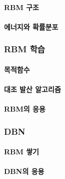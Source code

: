\documentclass [12pt] {oblivoir}
\let\oldsubsubsection=\subsubsection
\renewcommand{\subsubsection}
{
  \filbreak
  \oldsubsubsection
}
\begin{document}
\paragraph*{RBM 구조}\mbox{}

\vspace{3mm}

\paragraph*{에너지와 확률분포}\mbox{}

\vspace{3mm}

\subsubsection{RBM 학습}

\paragraph*{목적함수}\mbox{}

\vspace{3mm}

\paragraph*{대조 발산 알고리즘}\mbox{}

\vspace{3mm}

\paragraph*{RBM의 응용}\mbox{}

\vspace{3mm}

\subsubsection{DBN}

\paragraph*{RBM 쌓기}\mbox{}

\vspace{3mm}

\paragraph*{DBN의 응용}\mbox{}
\end{document}
